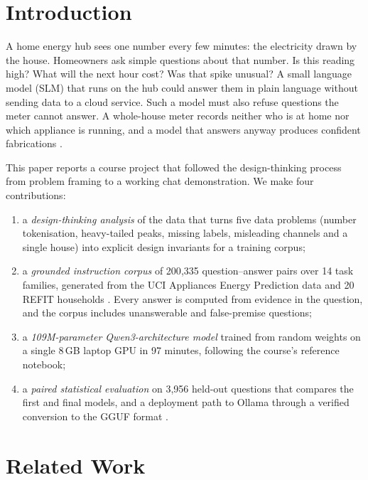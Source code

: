 \documentclass[conference]{IEEEtran}
\begin{document}
\section{Introduction}

A home energy hub sees one number every few minutes: the electricity drawn by the house. Homeowners ask simple
questions about that number. Is this reading high? What will the next hour cost? Was that spike unusual? A small
language model (SLM) that runs on the hub could answer them in plain language without sending data to a cloud
service. Such a model must also refuse questions the meter cannot answer. A whole-house meter records neither who
is at home nor which appliance is running, and a model that answers anyway produces confident fabrications
\cite{ji2023hallucination}.

This paper reports a course project that followed the design-thinking process \cite{brown2008design} from problem
framing to a working chat demonstration. We make four contributions:
\begin{enumerate}
  \item a \emph{design-thinking analysis} of the data that turns five data problems (number tokenisation,
        heavy-tailed peaks, missing labels, misleading channels and a single house) into explicit design invariants
        for a training corpus;
  \item a \emph{grounded instruction corpus} of 200{,}335 question--answer pairs over 14 task families, generated
        from the UCI Appliances Energy Prediction data \cite{candanedo2017} and 20 REFIT households
        \cite{murray2017refit}. Every answer is computed from evidence in the question, and the corpus includes
        unanswerable and false-premise questions;
  \item a \emph{109M-parameter Qwen3-architecture model} \cite{qwen3} trained from random weights on a single 8\,GB
        laptop GPU in 97 minutes, following the course's reference notebook;
  \item a \emph{paired statistical evaluation} on 3{,}956 held-out questions that compares the first and final models,
        and a deployment path to Ollama \cite{ollama} through a verified conversion to the GGUF format \cite{llamacpp}.
\end{enumerate}

\section{Related Work}
\end{document}

